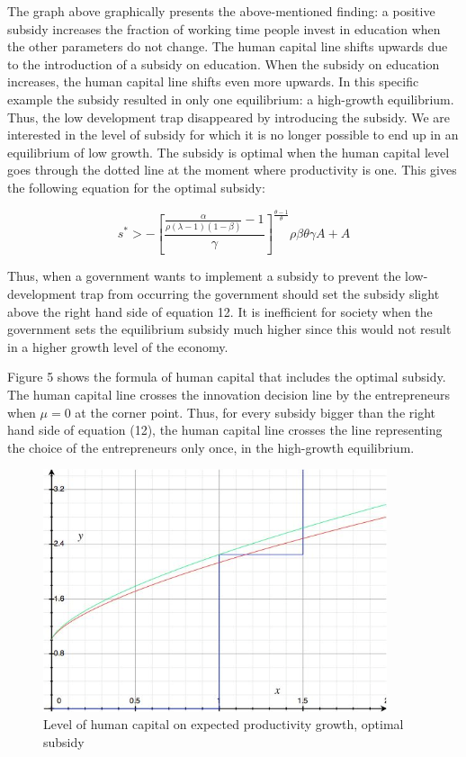 \documentclass[a4paper,11pt]{article} %
\begin{document}
The graph above graphically presents the above-mentioned finding: a positive subsidy increases the fraction of working time people invest in education when the other parameters do not change. The human capital line shifts upwards due to the introduction of a subsidy on education. When the subsidy on education increases, the human capital line shifts even more upwards. In this specific example the subsidy resulted in only one equilibrium: a high-growth equilibrium. Thus, the low development trap disappeared by introducing the subsidy. We are interested in the level of subsidy for which it is no longer possible to end up in an equilibrium of low growth. The subsidy is optimal when the human capital level goes through the dotted line at the moment where productivity is one. This gives the following equation for the optimal subsidy:

\begin{equation}
  s^* > - \left[ \frac{
   \frac{\alpha}{\rho \left( \lambda-1 \right) \left(1-\beta\right)}-1
    }{\gamma} \right]
  ^{ \frac{\theta-1}{\theta}}
  \rho\beta\theta\gamma A + A
\end{equation}

Thus, when a government wants to implement a subsidy to prevent the low-development trap from occurring the government should set the subsidy slight above the right hand side of equation 12. It is inefficient for society when the government sets the equilibrium subsidy much higher since this would not result in a higher growth level of the economy. 

Figure 5 shows the formula of human capital that includes the optimal subsidy. The human capital line crosses the innovation decision line by the entrepreneurs when \(\mu=0\) at the corner point. Thus, for every subsidy bigger than the right hand side of equation (12), the human capital line crosses the line representing the choice of the entrepreneurs only once, in the high-growth equilibrium.

\begin{figure}
  \centering
  \includegraphics[width=0.9\textwidth]{figure5.png}
  \caption{Level of human capital on expected productivity growth, optimal subsidy}
\end{figure}
\end{document}
